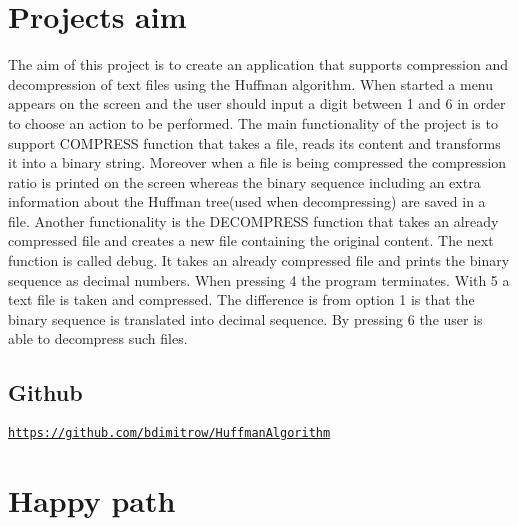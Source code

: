 \hypertarget{index_First}{}\section{Project\textquotesingle{}s aim}\label{index_First}
The aim of this project is to create an application that supports compression and decompression of text files using the Huffman algorithm. When started a menu appears on the screen and the user should input a digit between 1 and 6 in order to choose an action to be performed. The main functionality of the project is to support C\+O\+M\+P\+R\+E\+SS function that takes a file, reads its content and transforms it into a binary string. Moreover when a file is being compressed the compression ratio is printed on the screen whereas the binary sequence including an extra information about the Huffman tree(used when decompressing) are saved in a file. Another functionality is the D\+E\+C\+O\+M\+P\+R\+E\+SS function that takes an already compressed file and creates a new file containing the original content. The next function is called debug. It takes an already compressed file and prints the binary sequence as decimal numbers. When pressing 4 the program terminates. With 5 a text file is taken and compressed. The difference is from option 1 is that the binary sequence is translated into decimal sequence. By pressing 6 the user is able to decompress such files.\hypertarget{index_Github}{}\subsection{Github}\label{index_Github}
\href{https://github.com/bdimitrow/HuffmanAlgorithm}{\tt https\+://github.\+com/bdimitrow/\+Huffman\+Algorithm}\hypertarget{index_Second}{}\section{Happy path}\label{index_Second}
